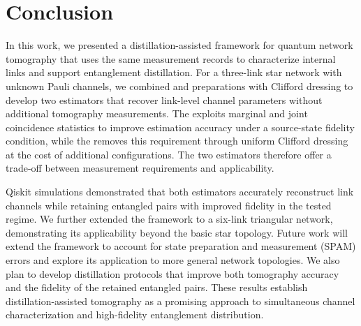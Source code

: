 \section{Conclusion}

In this work, we presented a distillation-assisted framework for quantum
network tomography that uses the same measurement records to characterize
internal links and support entanglement distillation. For a three-link
star network with unknown Pauli channels, we combined \unicast{} and
\mergecast{} preparations with Clifford dressing to develop two estimators
that recover link-level channel parameters without additional tomography
measurements.
The \jce{} exploits marginal and joint coincidence statistics to improve
estimation accuracy under a source-state fidelity condition, while the
\mce{} removes this requirement through uniform Clifford dressing at the
cost of additional configurations. The two estimators therefore offer
a trade-off between measurement requirements and applicability.

Qiskit simulations demonstrated that both estimators accurately
reconstruct link channels while retaining entangled pairs with improved
fidelity in the tested regime. We further extended the framework to a
six-link triangular network, demonstrating its applicability beyond
the basic star topology.
Future work will extend the framework to account for state preparation
and measurement (SPAM) errors and explore its application to more general
network topologies. We also plan to develop distillation protocols that
improve both tomography accuracy and the fidelity of the retained
entangled pairs. These results establish distillation-assisted tomography as a promising
approach to simultaneous channel characterization and high-fidelity
entanglement distribution.